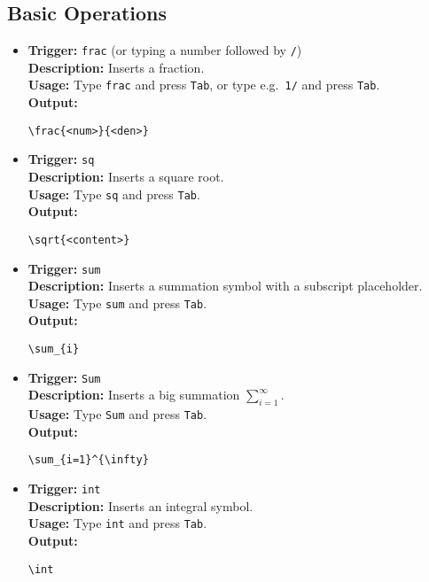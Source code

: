 \documentclass{article}
\begin{document}
\subsection{Basic Operations}
\begin{itemize}[leftmargin=*, label={}]
\item \textbf{Trigger:} \texttt{frac} (or typing a number followed by \texttt{/}) \\
\textbf{Description:} Inserts a fraction. \\
\textbf{Usage:} Type \texttt{frac} and press \texttt{Tab}, or type e.g.\ \texttt{1/} and press \texttt{Tab}. \\
\textbf{Output:}
\begin{verbatim}
\frac{<num>}{<den>}
\end{verbatim}

\item \textbf{Trigger:} \texttt{sq} \\
\textbf{Description:} Inserts a square root. \\
\textbf{Usage:} Type \texttt{sq} and press \texttt{Tab}. \\
\textbf{Output:}
\begin{verbatim}
\sqrt{<content>}
\end{verbatim}

\item \textbf{Trigger:} \texttt{sum} \\
\textbf{Description:} Inserts a summation symbol with a subscript placeholder. \\
\textbf{Usage:} Type \texttt{sum} and press \texttt{Tab}. \\
\textbf{Output:}
\begin{verbatim}
\sum_{i} 
\end{verbatim}

\item \textbf{Trigger:} \texttt{Sum} \\
\textbf{Description:} Inserts a big summation \(\sum_{i=1}^\infty\). \\
\textbf{Usage:} Type \texttt{Sum} and press \texttt{Tab}. \\
\textbf{Output:}
\begin{verbatim}
\sum_{i=1}^{\infty}
\end{verbatim}

\item \textbf{Trigger:} \texttt{int} \\
\textbf{Description:} Inserts an integral symbol. \\
\textbf{Usage:} Type \texttt{int} and press \texttt{Tab}. \\
\textbf{Output:}
\begin{verbatim}
\int 
\end{verbatim}


\end{itemize}
\end{document}
